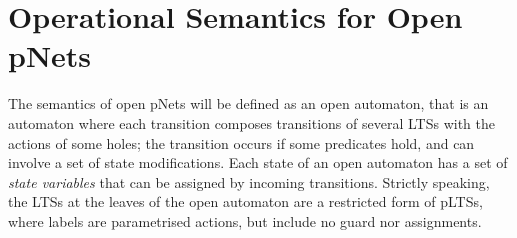 \documentclass{lncs/llncs}
\newcommand{\noteSB}[2][color=green!40, size=\tiny]{\todo[#1]{{\bf
      Note: } {#2}}}
\newcommand{\noteEM}[2][color=blue!40, size=\tiny]{\todo[#1]{{\bf Eric: } {#2}}}
\newcommand{\TODO}[1]{\textcolor{red}{\textbf{[TODO:#1]}}}
\begin{document}








\section{Operational Semantics for Open pNets}
\label{section:op-semantics}

The semantics of open pNets will be defined as an open automaton, that
is an automaton where each transition composes transitions 
of several
LTSs with the actions of some holes; the transition occurs if some predicates hold,
and can involve a set of state modifications. Each state of an open
automaton has a set of \emph{state variables} that can be assigned by
incoming transitions. Strictly speaking, the LTSs at the leaves of the
open automaton are a restricted form of pLTSs, where labels are
parametrised actions, but include no guard nor assignments.
\end{document}
